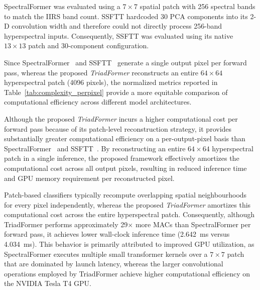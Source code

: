 \documentclass[pdflatex,sn-mathphys-num]{sn-jnl}
\begin{document}
\begin{table}[!t]
\centering
\caption{Computational complexity normalized per output pixel.}
\label{tab:complexity_perpixel}
\end{table}

SpectralFormer was evaluated using a $7\times7$ spatial patch with 256 spectral bands to match the IIRS band count. SSFTT hardcoded 30 PCA components into its 2-D convolution width and therefore could not directly process 256-band hyperspectral inputs. Consequently, SSFTT was evaluated using its native $13\times13$ patch and 30-component configuration.

Since SpectralFormer~\cite{ref12} and SSFTT~\cite{ref11} generate a single output pixel per forward pass, whereas the proposed \textit{TriadFormer} reconstructs an entire $64\times64$ hyperspectral patch (4096 pixels), the normalized metrics reported in Table~\ref{tab:complexity_perpixel} provide a more equitable comparison of computational efficiency across different model architectures.

Although the proposed \textit{TriadFormer} incurs a higher computational cost per forward pass because of its patch-level reconstruction strategy, it provides substantially greater computational efficiency on a per-output-pixel basis than SpectralFormer~\cite{ref12} and SSFTT~\cite{ref11}. By reconstructing an entire $64\times64$ hyperspectral patch in a single inference, the proposed framework effectively amortizes the computational cost across all output pixels, resulting in reduced inference time and GPU memory requirement per reconstructed pixel.

Patch-based classifiers typically recompute overlapping spatial neighbourhoods for every pixel independently, whereas the proposed \textit{TriadFormer} amortizes this computational cost across the entire hyperspectral patch. Consequently, although TriadFormer performs approximately 29$\times$ more MACs than SpectralFormer per forward pass, it achieves lower wall-clock inference time (2.642~ms versus 4.034~ms). This behavior is primarily attributed to improved GPU utilization, as SpectralFormer executes multiple small transformer kernels over a $7\times7$ patch that are dominated by launch latency, whereas the larger convolutional operations employed by TriadFormer achieve higher computational efficiency on the NVIDIA Tesla T4 GPU.
\end{document}
